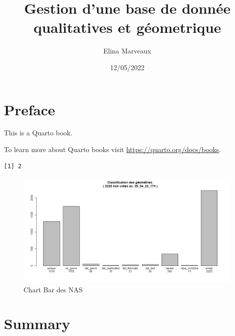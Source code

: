 \documentclass[
  a4paper,
]{scrbook}
\title{Gestion d'une base de donnée qualitatives et géometrique}
\author{Elina Marveaux}
\date{12/05/2022}
\renewcommand*\contentsname{Table of contents}
\newcommand\contentsname{Table of contents}
\begin{document}
\frontmatter
\maketitle
\ifdefined\Shaded\renewenvironment{Shaded}{\begin{tcolorbox}[boxrule=0pt, sharp corners, frame hidden, enhanced, interior hidden, borderline west={3pt}{0pt}{shadecolor}, breakable]}{\end{tcolorbox}}\fi

\renewcommand*\contentsname{Table des matières}
{
\setcounter{tocdepth}{2}
\tableofcontents
}
\listoffigures
\listoftables
\mainmatter
\hypertarget{preface}{%
\chapter*{Preface}\label{preface}}

This is a Quarto book.

To learn more about Quarto books visit
\url{https://quarto.org/docs/books}.

\begin{verbatim}
[1] 2
\end{verbatim}

\begin{figure}

{\centering \includegraphics{./figures/bar_classify_Del_29_04_22_17h.png}

}

\caption{Chart Bar des NAS}

\end{figure}

\hypertarget{summary}{%
\chapter{Summary}\label{summary}}
\end{document}
